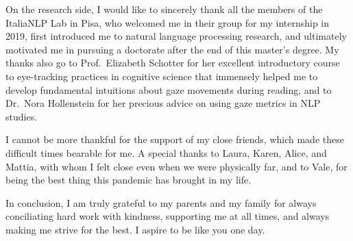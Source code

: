 \documentclass[a4paper, nobind]{templates/ociamthesis}
\begin{document}
\begin{romanpages}
\begin{acknowledgements}
\vspace{5mm}

On the research side, I would like to sincerely thank all the members of the ItaliaNLP Lab in Pisa, who welcomed me in their group for my internship in 2019, first introduced me to natural language processing research, and ultimately motivated me in pursuing a doctorate after the end of this master's degree. My thanks also go to Prof.~Elizabeth Schotter for her excellent introductory course to eye-tracking practices in cognitive science that immensely helped me to develop fundamental intuitions about gaze movements during reading, and to Dr.~Nora Hollenstein for her precious advice on using gaze metrics in NLP studies.

\vspace{5mm}

I cannot be more thankful for the support of my close friends, which made these difficult times bearable for me. A special thanks to Laura, Karen, Alice, and Mattia, with whom I felt close even when we were physically far, and to Vale, for being the best thing this pandemic has brought in my life.

\vspace{5mm}

In conclusion, I am truly grateful to my parents and my family for always conciliating hard work with kindness, supporting me at all times, and always making me strive for the best. I aspire to be like you one day.
\end{acknowledgements}


\end{romanpages}
\end{document}
